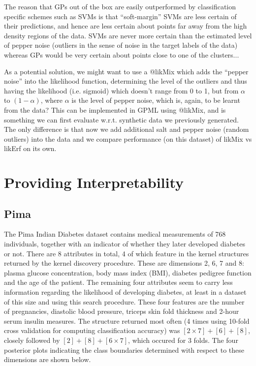 \documentclass[a4paper,12pt ]{report}
\begin{document}
The reason that GPs out of the box are easily outperformed by classification specific schemes such as SVMs is that “soft-margin” SVMs are less certain of their predictions, and hence are less certain about points far away from the high density regions of the data. SVMs are never more certain than the estimated level of pepper noise (outliers in the sense of noise in the target labels of the data) whereas GPs would be very certain about points close to one of the clusters...

As a potential solution, we might want to use a @likMix which adds the “pepper noise” into the likelihood function, determining the level of the outliers and thus having the likelihood (i.e. sigmoid) which doesn’t range from 0 to 1, but from $\alpha$ to $(1 - \alpha)$, where $\alpha$ is the level of pepper noise, which is, again, to be learnt from the data? This can be implemented in GPML using @likMix, and is something we can first evaluate w.r.t. synthetic data we previously generated. The only difference is that now we add additional salt and pepper noise (random outliers) into the data and we compare performance (on this dataset) of likMix vs likErf on its own.


\section{Providing Interpretability}

\subsection{Pima}

The Pima Indian Diabetes dataset contains medical measurements of 768 individuals, together with an indicator of whether they later developed diabetes or not. There are 8 attributes in total, 4 of which feature in the kernel structures returned by the kernel discovery procedure. 
These are dimensions 2, 6, 7 and 8: plasma glucose concentration, body mass index (BMI), diabetes pedigree function and the age of the patient. The remaining four attributes seem to carry less information regarding the likelihood of developing diabetes, at least 
in a dataset of this size and using this search procedure. These four features are the number of pregnancies, diastolic blood pressure, triceps skin fold thickness and 2-hour serum insulin measures. The structure returned most often (4 times using 10-fold cross validation 
for computing classification accuracy) was $[2\times7] + [6] + [8]$, closely followed by $[2]+[8]+[6 \times 7]$, which occured for 3 folds. The four posterior plots indicating the class boundaries determined with respect to these dimensions are shown below. 
\end{document}
